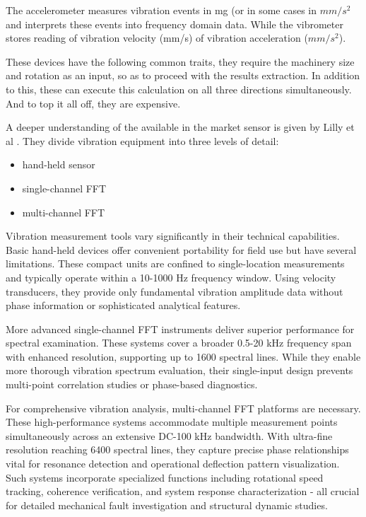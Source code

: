 {{The accelerometer measures vibration events in mg (or in some cases in $mm/s^2$ and interprets these events into frequency domain data. While the vibrometer stores reading of vibration velocity (mm/s) of vibration acceleration ($mm/s^2$).

These devices have the following common traits, they require the machinery size and rotation as an input, so as to proceed with the results extraction. In addition to this, these can execute this calculation on all three directions simultaneously. And to top it all off, they are expensive. 

A deeper understanding of the available in the market sensor is given by Lilly et al \cite{Lilly2008}. They divide vibration equipment into three levels of detail: 
\begin{itemize}
	\item hand-held sensor
	\item single-channel FFT
	\item multi-channel FFT
\end{itemize}

Vibration measurement tools vary significantly in their technical capabilities. Basic hand-held devices offer convenient portability for field use but have several limitations. These compact units are confined to single-location measurements and typically operate within a 10-1000 Hz frequency window. Using velocity transducers, they provide only fundamental vibration amplitude data without phase information or sophisticated analytical features.

More advanced single-channel FFT instruments deliver superior performance for spectral examination. These systems cover a broader 0.5-20 kHz frequency span with enhanced resolution, supporting up to 1600 spectral lines. While they enable more thorough vibration spectrum evaluation, their single-input design prevents multi-point correlation studies or phase-based diagnostics.

For comprehensive vibration analysis, multi-channel FFT platforms are necessary. These high-performance systems accommodate multiple measurement points simultaneously across an extensive DC-100 kHz bandwidth. With ultra-fine resolution reaching 6400 spectral lines, they capture precise phase relationships vital for resonance detection and operational deflection pattern visualization. Such systems incorporate specialized functions including rotational speed tracking, coherence verification, and system response characterization - all crucial for detailed mechanical fault investigation and structural dynamic studies.

}}
